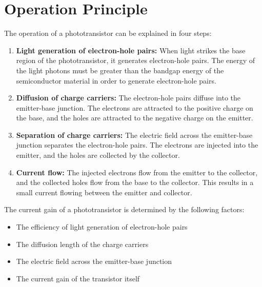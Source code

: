\section{Operation Principle}
The operation of a phototransistor can be explained in four steps:
\begin{enumerate}
    \item \textbf{Light generation of electron-hole pairs:} When light strikes the base region of the phototransistor, it generates electron-hole pairs.
    The energy of the light photons must be greater than the bandgap energy of the semiconductor material in order to generate electron-hole pairs.
    \item \textbf{Diffusion of charge carriers:} The electron-hole pairs diffuse into the emitter-base junction.
    The electrons are attracted to the positive charge on the base, and the holes are attracted to the negative charge on the emitter.
    \item \textbf{Separation of charge carriers:} The electric field across the emitter-base junction separates the electron-hole pairs.
    The electrons are injected into the emitter, and the holes are collected by the collector.
    \item \textbf{Current flow:} The injected electrons flow from the emitter to the collector, and the collected holes flow from the base to the collector.
    This results in a small current flowing between the emitter and collector.
\end{enumerate}

\noindent The current gain of a phototransistor is determined by the following factors:

\begin{itemize}
    \item The efficiency of light generation of electron-hole pairs
    \item The diffusion length of the charge carriers
    \item The electric field across the emitter-base junction
    \item The current gain of the transistor itself
\end{itemize}